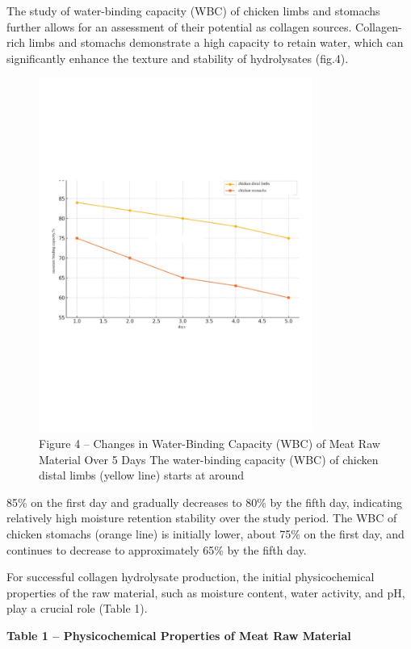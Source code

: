 The study of water-binding capacity (WBC) of chicken limbs and stomachs
further allows for an assessment of their potential as collagen sources.
Collagen-rich limbs and stomachs demonstrate a high capacity to retain
water, which can significantly enhance the texture and stability of
hydrolysates (fig.4).

\begin{figure}[H]
	\centering
	\includegraphics[width=0.8\textwidth]{media/pish/image12}
	\caption*{Figure 4 -- Changes in Water-Binding Capacity (WBC) of Meat Raw
  Material Over 5 Days The water-binding capacity (WBC) of chicken distal
  limbs (yellow line) starts at around}
\end{figure}


85\% on the first day and gradually decreases to 80\% by the fifth day,
indicating relatively high moisture retention stability over the study
period. The WBC of chicken stomachs (orange line) is initially lower,
about 75\% on the first day, and continues to decrease to approximately
65\% by the fifth day.

For successful collagen hydrolysate production, the initial
physicochemical properties of the raw material, such as moisture
content, water activity, and pH, play a crucial role (Table 1).

{\bfseries Table 1 -- Physicochemical Properties of Meat Raw Material}

